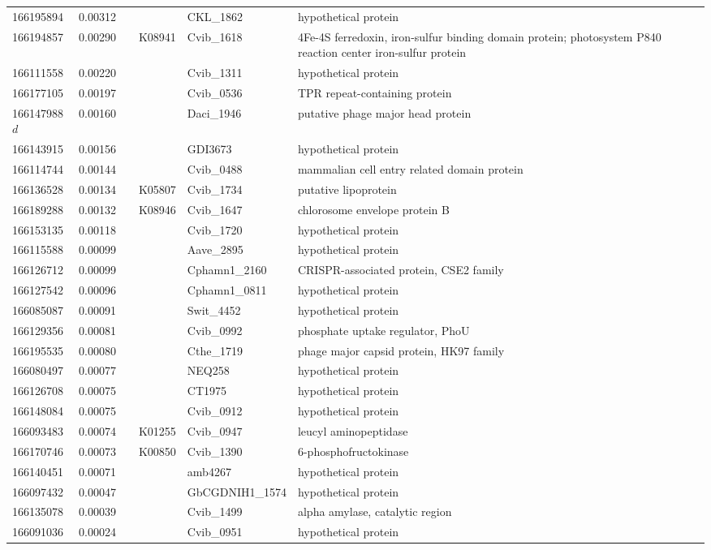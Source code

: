 \begin{landscape}
\begin{longtable}{p{1.6cm}p{1.2cm}p{1.5cm}p{1.5cm}p{2.8cm}p{13.5cm}}
166195894&0.00312&&&CKL\_1862&hypothetical protein \\
166194857&0.00290&&K08941&Cvib\_1618&4Fe-4S ferredoxin, iron-sulfur binding domain protein; photosystem P840 reaction center iron-sulfur protein \\
166111558&0.00220&&&Cvib\_1311&hypothetical protein \\
166177105&0.00197&&&Cvib\_0536&TPR repeat-containing protein \\
166147988$d$&0.00160&&&Daci\_1946&putative phage major head protein \\
166143915&0.00156&&&GDI3673&hypothetical protein \\
166114744&0.00144&&&Cvib\_0488&mammalian cell entry related domain protein \\
166136528&0.00134&&K05807&Cvib\_1734&putative lipoprotein \\
166189288&0.00132&&K08946&Cvib\_1647&chlorosome envelope protein B \\
166153135&0.00118&&&Cvib\_1720&hypothetical protein \\
166115588&0.00099&&&Aave\_2895&hypothetical protein \\
166126712&0.00099&&&Cphamn1\_2160&CRISPR-associated protein, CSE2 family \\
166127542&0.00096&&&Cphamn1\_0811&hypothetical protein \\
166085087&0.00091&&&Swit\_4452&hypothetical protein \\
166129356&0.00081&&&Cvib\_0992&phosphate uptake regulator, PhoU \\
166195535&0.00080&&&Cthe\_1719&phage major capsid protein, HK97 family \\
166080497&0.00077&&&NEQ258&hypothetical protein \\
166126708&0.00075&&&CT1975&hypothetical protein \\
166148084&0.00075&&&Cvib\_0912&hypothetical protein \\
166093483&0.00074&&K01255&Cvib\_0947&leucyl aminopeptidase \\
166170746&0.00073&&K00850&Cvib\_1390&6-phosphofructokinase \\
166140451&0.00071&&&amb4267&hypothetical protein \\
166097432&0.00047&&&GbCGDNIH1\_1574&hypothetical protein \\
166135078&0.00039&&&Cvib\_1499&alpha amylase, catalytic region \\
166091036&0.00024&&&Cvib\_0951&hypothetical protein \\

\end{longtable}
\end{landscape}
